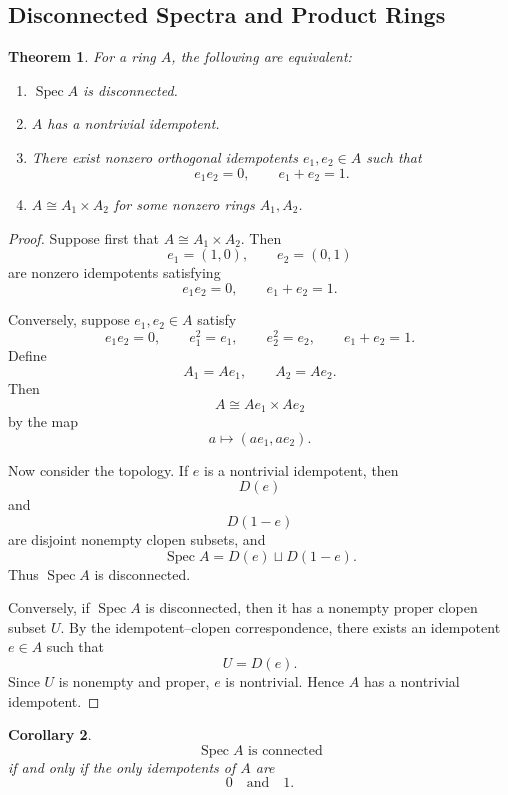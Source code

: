 \documentclass[12pt,a4paper]{article}
\newtheorem{theorem}{Theorem}[section]
\newtheorem{corollary}[theorem]{Corollary}
\newcommand{\Spec}{\operatorname{Spec}}
\begin{document}
\subsection{Disconnected Spectra and Product Rings}

\begin{theorem}
	For a ring \(A\), the following are equivalent:
	
	\begin{enumerate}[label=\roman*)]
		\item \(\Spec A\) is disconnected.
		
		\item \(A\) has a nontrivial idempotent.
		
		\item There exist nonzero orthogonal idempotents \(e_1,e_2\in A\) such that
		\[
		e_1e_2=0,
		\qquad
		e_1+e_2=1.
		\]
		
		\item \(A\cong A_1\times A_2\) for some nonzero rings \(A_1,A_2\).
	\end{enumerate}
\end{theorem}

\begin{proof}
	Suppose first that \(A\cong A_1\times A_2\). Then
	\[
	e_1=(1,0),
	\qquad
	e_2=(0,1)
	\]
	are nonzero idempotents satisfying
	\[
	e_1e_2=0,
	\qquad
	e_1+e_2=1.
	\]
	
	Conversely, suppose \(e_1,e_2\in A\) satisfy
	\[
	e_1e_2=0,
	\qquad
	e_1^2=e_1,
	\qquad
	e_2^2=e_2,
	\qquad
	e_1+e_2=1.
	\]
	Define
	\[
	A_1=Ae_1,
	\qquad
	A_2=Ae_2.
	\]
	Then
	\[
	A\cong Ae_1\times Ae_2
	\]
	by the map
	\[
	a\longmapsto (ae_1,ae_2).
	\]
	
	Now consider the topology. If \(e\) is a nontrivial idempotent, then
	\[
	D(e)
	\]
	and
	\[
	D(1-e)
	\]
	are disjoint nonempty clopen subsets, and
	\[
	\Spec A=D(e)\sqcup D(1-e).
	\]
	Thus \(\Spec A\) is disconnected.
	
	Conversely, if \(\Spec A\) is disconnected, then it has a nonempty proper
	clopen subset \(U\). By the idempotent--clopen correspondence, there exists an
	idempotent \(e\in A\) such that
	\[
	U=D(e).
	\]
	Since \(U\) is nonempty and proper, \(e\) is nontrivial. Hence \(A\) has a
	nontrivial idempotent.
\end{proof}

\begin{corollary}
	\[
	\Spec A\text{ is connected}
	\]
	if and only if the only idempotents of \(A\) are
	\[
	0
	\quad\text{and}\quad
	1.
	\]
\end{corollary}
\end{document}

